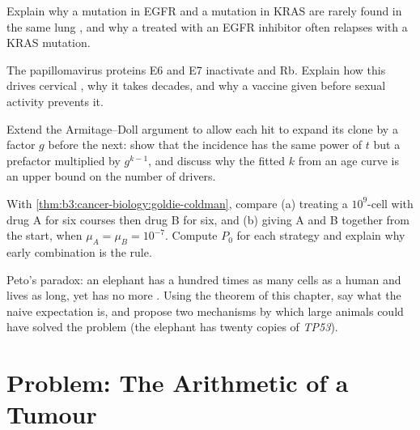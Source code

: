 \begin{exercise}[$\star\star$]\label{exo:b3:cancer-biology:8}
Explain why a mutation in EGFR and a mutation in KRAS are rarely
found in the same lung , and why a  treated with an EGFR
inhibitor often relapses with a KRAS mutation.
\end{exercise}

\begin{exercise}[$\star\star$]\label{exo:b3:cancer-biology:9}
The papillomavirus proteins E6 and E7 inactivate  and Rb. Explain
how this drives cervical , why it takes decades, and why a
vaccine given before sexual activity prevents it.
\end{exercise}

\begin{exercise}[$\star\star\star$]\label{exo:b3:cancer-biology:10}
Extend the Armitage--Doll argument to allow each hit to expand its
clone by a factor $g$ before the next: show that the incidence has the
same power of $t$ but a prefactor multiplied by $g^{k-1}$, and discuss
why the fitted $k$ from an age curve is an upper bound on the number of
drivers.
\end{exercise}

\begin{exercise}[$\star\star\star$]\label{exo:b3:cancer-biology:11}
With \cref{thm:b3:cancer-biology:goldie-coldman}, compare (a) treating a
$10^{9}$-cell  with drug A for six courses then drug B for six,
and (b) giving A and B together from the start, when $\mu_{A} =
\mu_{B} = 10^{-7}$. Compute $P_{0}$ for each strategy and explain why
early combination is the rule.
\end{exercise}

\begin{exercise}[$\star\star\star$]\label{exo:b3:cancer-biology:12}
Peto's paradox: an elephant has a hundred times as many cells as a
human and lives as long, yet has no more . Using the theorem of
this chapter, say what the naive expectation is, and propose two
mechanisms by which large animals could have solved the problem (the
elephant has twenty copies of \emph{TP53}).
\end{exercise}

\section{Problem: The Arithmetic of a Tumour}

